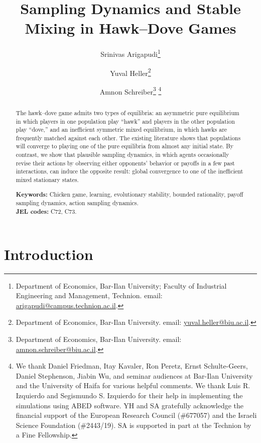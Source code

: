 \documentclass[12pt]{article}
\numberwithin{equation}{section}
\numberwithin{figure}{section}
\theoremstyle{definition}
\theoremstyle{plain}
\theoremstyle{plain}
\theoremstyle{plain}
\theoremstyle{remark}
\theoremstyle{plain}
\theoremstyle{plain}
\begin{document}
\title{{\large{}Sampling Dynamics and Stable Mixing in Hawk--Dove Games\\}}
\author{Srinivas Arigapudi\thanks{
Department of Economics, Bar-Ilan University; Faculty of Industrial Engineering and Management, Technion. email: \protect\href{mailto:arigapudi@campus.technion.ac.il}{arigapudi@campus.technion.ac.il}.}
\and Yuval Heller\thanks{Department of Economics, Bar-Ilan University. email: \protect\href{mailto:yuval.heller@biu.ac.il}{yuval.heller@biu.ac.il}. }
\and Amnon Schreiber\thanks{Department of Economics, Bar-Ilan University. email: \protect\href{mailto:amnon.schreiber@biu.ac.il}{amnon.schreiber@biu.ac.il}. }
\thanks{We thank Daniel Friedman, Itay Kavaler, Ron Peretz, Ernst Schulte-Geers, Daniel Stephenson, Jiabin Wu, and seminar audiences at Bar-Ilan University and the University of Haifa for various helpful comments. We thank  Luis R. Izquierdo and Segismundo S. Izquierdo for their help in implementing the simulations using ABED software. YH and SA  gratefully acknowledge the financial support of the European Research
Council (\#677057) and the Israeli Science Foundation (\#2443/19). SA is supported in part at the Technion by a Fine Fellowship.
}}
\maketitle
\begin{abstract}
The hawk--dove game admits two 
types of equilibria: an asymmetric pure equilibrium in which players in one population play “hawk'' and players in the other population play ``dove,'' and an 
inefficient symmetric  mixed equilibrium, 
in which hawks are frequently matched against each other.
The existing  
literature shows that populations will converge to playing one of the 
pure equilibria  from almost any initial state. By contrast, we show that plausible sampling dynamics, in which agents occasionally revise their actions by observing either opponents' behavior or payoffs in a few past interactions, can induce the opposite result:  global convergence to one of the inefficient mixed stationary states.

\textbf{Keywords: }Chicken game, learning, evolutionary stability, bounded rationality, payoff sampling dynamics, action sampling dynamics.\\
\textbf{JEL codes: }C72, C73.
\end{abstract}

\section{Introduction}
\end{document}
